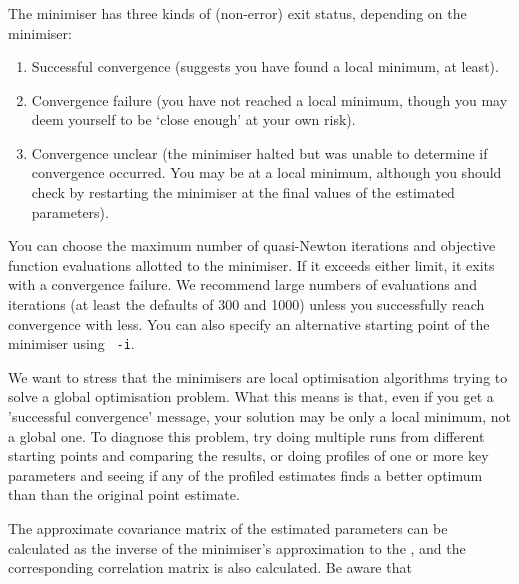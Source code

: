 \subsubsection{}

The minimiser has three kinds of (non-error) exit status, depending on the minimiser:

\begin{enumerate}
\item Successful convergence (suggests you have found a local minimum, at least).
\item Convergence failure (you have not reached a local minimum, though you may deem yourself to be `close enough' at your own risk).
\item Convergence unclear (the minimiser halted but was unable to determine if convergence occurred. You may be at a local minimum, although you should check by restarting the minimiser at the final values of the estimated parameters).
\end{enumerate}

You can choose the maximum number of quasi-Newton iterations and objective function evaluations allotted to the minimiser. If it exceeds either limit, it exits with a convergence failure. We recommend large numbers of evaluations and iterations (at least the defaults of 300 and 1000) unless you successfully reach convergence with less. You can also specify an alternative starting point of the minimiser using \texttt{\cname\ -i}.

We want to stress that the minimisers are local optimisation algorithms trying to solve a global optimisation problem. What this means is that, even if you get a 'successful convergence' message, your solution may be only a local minimum, not a global one. To diagnose this problem, try doing multiple runs from different starting points and comparing the results, or doing profiles of one or more key parameters and seeing if any of the profiled estimates finds a better optimum than than the original point estimate.

The approximate covariance matrix of the estimated parameters can be calculated as the inverse of the minimiser's approximation to the , and the corresponding correlation matrix is also calculated. Be aware that

